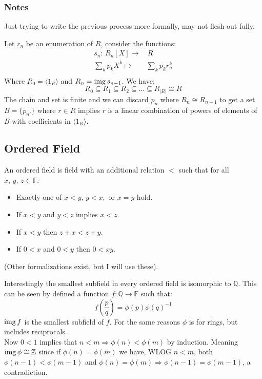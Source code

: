 \subsubsection{Notes}
Just trying to write the previous process more formally, 
may not flesh out fully.

Let $r_n$ be an enumeration of $R$, 
consider the functions:
\begin{equation*}
\begin{aligned}
	s_n:\,R_n[X]\longrightarrow&\, R\\
	\sum_kp_kX^k\mapsto& \sum_kp_kr^k_n \\
\end{aligned}
\end{equation*}
Where $R_0 =\langle 1_R \rangle$ and $R_n = \operatorname{img} s_{n-1}$.
We have:
\[R_0 \subseteq R_1 \subseteq R_2 \subseteq \dots \subseteq R_{|R|} \cong R\]
The chain and set is finite and we can discard $p_n$ where $R_{n} \cong R_{n-1}$ to get a set $B=\{p_{n'}\}$ where $r\in R$ implies $r$ is a linear combination of powers of elements of $B$ with coefficients in $\langle 1_R \rangle$.

\subsection{Ordered Field}
An ordered field is field with an additional relation $<$ such that for all $x,\,y,\,z\in\mathbb{F}$:
\begin{itemize}
	\item Exactly one of $x<y,\,y<x,$ or $x=y$ hold.
	\item If $x<y$ and $y<z$ implies $x<z$.
	\item If $x<y$ then  $z+x<z+y$.
	\item If $0<x$ and $0<y$ then $0<xy$.
\end{itemize}
(Other formalizations exist, but I will use these).

Interestingly the smallest subfield in every ordered field is isomorphic to $\mathbb{Q}$.
This can be seen by defined a function $f:\mathbb{Q}\rightarrow \mathbb{F}$ such that:
\[f\left(\frac{p}{q}\right) = \phi(p)\phi(q)^{-1}\]
$\operatorname{img} f$ is the smallest subfield of $f$.
For the same reasons $\phi$ is for rings,
but includes reciprocals.
\\

Now $0<1$ implies that $n<m \Rightarrow \phi(n)<\phi(m)$ by induction.
Meaning $\operatorname{img} \phi \cong \mathbb{Z}$ since if $\phi(n)=\phi(m)$ we have, WLOG $n<m$, both $\phi(n-1) < \phi(m-1)$ and $\phi(n) = \phi(m)\Rightarrow \phi(n-1) = \phi(m-1)$,
a contradiction.

